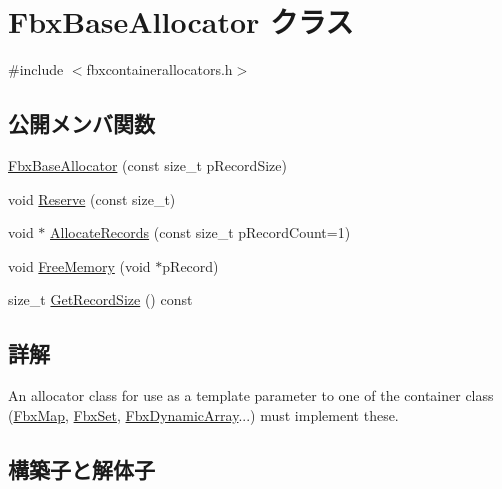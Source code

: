 \hypertarget{class_fbx_base_allocator}{}\section{Fbx\+Base\+Allocator クラス}
\label{class_fbx_base_allocator}


{\ttfamily \#include $<$fbxcontainerallocators.\+h$>$}

\subsection*{公開メンバ関数}
\begin{DoxyCompactItemize}
\item 
\hyperlink{class_fbx_base_allocator_a9597eb137f26dc696170b9eddf0298a5}{Fbx\+Base\+Allocator} (const size\+\_\+t p\+Record\+Size)
\item 
void \hyperlink{class_fbx_base_allocator_ad84870f23a2b067b3bade2604dab2621}{Reserve} (const size\+\_\+t)
\item 
void $\ast$ \hyperlink{class_fbx_base_allocator_a3701773862fa1a808aaff72a3b541d8f}{Allocate\+Records} (const size\+\_\+t p\+Record\+Count=1)
\item 
void \hyperlink{class_fbx_base_allocator_a345b6d46e57e8313966a5f3654d1195c}{Free\+Memory} (void $\ast$p\+Record)
\item 
size\+\_\+t \hyperlink{class_fbx_base_allocator_ab7aa3164aa6fc973baca1515b494198f}{Get\+Record\+Size} () const
\end{DoxyCompactItemize}


\subsection{詳解}
An allocator class for use as a template parameter to one of the container class (\hyperlink{class_fbx_map}{Fbx\+Map}, \hyperlink{class_fbx_set}{Fbx\+Set}, \hyperlink{class_fbx_dynamic_array}{Fbx\+Dynamic\+Array}...) must implement these. 

\subsection{構築子と解体子}
\mbox{\label{class_fbx_base_allocator_a9597eb137f26dc696170b9eddf0298a5}} 
